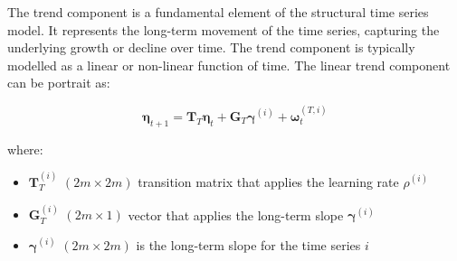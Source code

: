     The trend component is a fundamental element of the structural time series model.
    It represents the long-term movement of the time series, capturing the underlying growth or decline over time.
    The trend component is typically modelled as a linear or non-linear function of time.
    The linear trend component can be portrait as:


    \begin{equation}
        \bm{\eta}_{t+1}=
            \bm{T}_{T} \bm{\eta}_{t} + \bm{G}_{T} \bm{\gamma}^{(i)} + \bm{\omega}_{t}^{(T,i)}
        \label{eq:trend_state}
    \end{equation}

    where:
    \begin{itemize}
        \item $\bm{T}_T^{(i)}$ $(2m \times 2m)$ transition matrix that applies the learning rate $\rho^{(i)}$
        \item $\bm{G}_T^{(i)}$ $(2m \times 1)$ vector that applies the long-term slope $\bm{\gamma}^{(i)}$
        \item $\bm{\gamma}^{(i)}$ $(2m \times 2m)$ is the long-term slope for the time series $i$
    \end{itemize}

%

